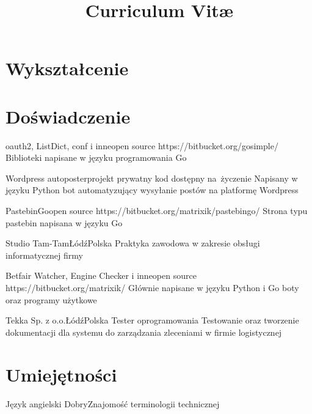 \documentclass[11pt,a4paper,sans,polish]{moderncv}   %
\title{Curriculum Vit\ae{}}
\begin{document}
\makecvtitle

\vspace{-0.7cm}


\section{Wykształcenie}

\vspace{-0.2cm}



\section{Doświadczenie}

	{oauth2, ListDict, conf i inne}{open source}{}
	{https://bitbucket.org/gosimple/}
	{Biblioteki napisane w języku programowania Go}

	{Wordpress autoposter}{projekt prywatny}{}
	{kod dostępny na~życzenie}
	{Napisany w języku Python bot automatyzujący wysyłanie postów na platformę Wordpress}

	{PastebinGo}{open source}{}
	{https://bitbucket.org/matrixik/pastebingo/}
	{Strona typu pastebin napisana w języku Go}

	{Studio Tam-Tam}{Łódź}{Polska}
	{}
	{Praktyka zawodowa w zakresie obsługi informatycznej firmy}

	{Betfair Watcher, Engine Checker i inne}{open source}{}
	{https://bitbucket.org/matrixik/}
	{Głównie napisane w języku Python i Go boty oraz programy użytkowe}

	{Tekka Sp. z o.o.}{Łódź}{Polska}
	{Tester oprogramowania}
	{Testowanie oraz tworzenie dokumentacji dla systemu do zarządzania
	zleceniami w firmie logistycznej}


\section{Umiejętności}

\cvitemwithcomment
	{Język angielski}
	{Dobry}{Znajomość terminologii technicznej}
\end{document}
